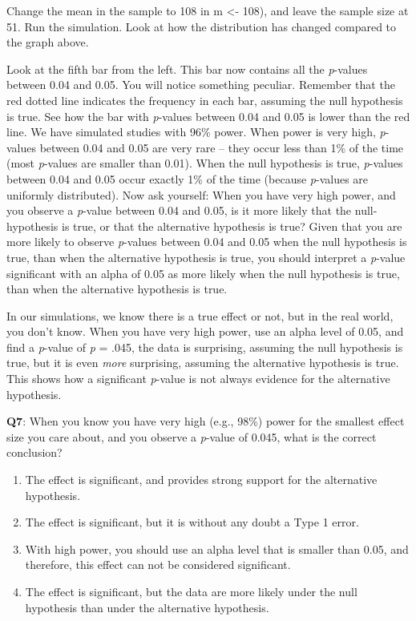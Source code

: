 \documentclass[
]{krantz}
\providecommand{\tightlist}{%
  \setlength{\itemsep}{0pt}\setlength{\parskip}{0pt}}
\begin{document}
Change the mean in the sample to 108 in m \textless- 108), and leave the sample size at 51. Run the simulation. Look at how the distribution has changed compared to the graph above.

Look at the fifth bar from the left. This bar now contains all the \emph{p}-values between 0.04 and 0.05. You will notice something peculiar. Remember that the red dotted line indicates the frequency in each bar, assuming the null hypothesis is true. See how the bar with \emph{p}-values between 0.04 and 0.05 is lower than the red line. We have simulated studies with 96\% power. When power is very high, \emph{p}-values between 0.04 and 0.05 are very rare -- they occur less than 1\% of the time (most \emph{p}-values are smaller than 0.01). When the null hypothesis is true, \emph{p}-values between 0.04 and 0.05 occur exactly 1\% of the time (because \emph{p}-values are uniformly distributed). Now ask yourself: When you have very high power, and you observe a \emph{p}-value between 0.04 and 0.05, is it more likely that the null-hypothesis is true, or that the alternative hypothesis is true? Given that you are more likely to observe \emph{p}-values between 0.04 and 0.05 when the null hypothesis is true, than when the alternative hypothesis is true, you should interpret a \emph{p}-value significant with an alpha of 0.05 as more likely when the null hypothesis is true, than when the alternative hypothesis is true.

In our simulations, we know there is a true effect or not, but in the real world, you don't know. When you have very high power, use an alpha level of 0.05, and find a \emph{p}-value of \emph{p} = .045, the data is surprising, assuming the null hypothesis is true, but it is even \emph{more} surprising, assuming the alternative hypothesis is true. This shows how a significant \emph{p}-value is not always evidence for the alternative hypothesis.

\textbf{Q7}: When you know you have very high (e.g., 98\%) power for the smallest effect size you care about, and you observe a \emph{p}-value of 0.045, what is the correct conclusion?

\begin{enumerate}
\def\labelenumi{\Alph{enumi})}
\tightlist
\item
  The effect is significant, and provides strong support for the alternative hypothesis.
\item
  The effect is significant, but it is without any doubt a Type 1 error.
\item
  With high power, you should use an alpha level that is smaller than 0.05, and therefore, this effect can not be considered significant.
\item
  The effect is significant, but the data are more likely under the null hypothesis than under the alternative hypothesis.
\end{enumerate}
\end{document}
